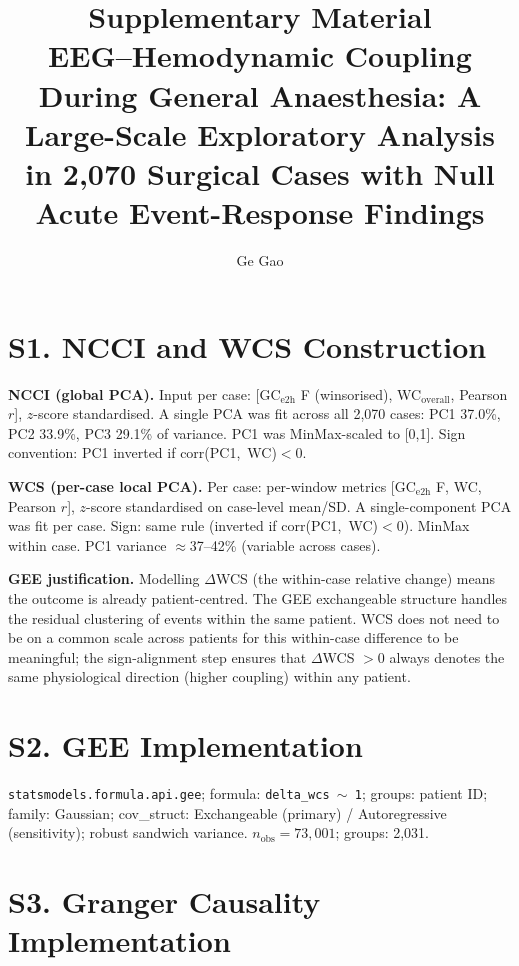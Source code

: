 \documentclass[fleqn,10pt]{wlpeerj}
\title{Supplementary Material\\[4pt]
\large EEG--Hemodynamic Coupling During General Anaesthesia:
A Large-Scale Exploratory Analysis in 2,070 Surgical Cases
with Null Acute Event-Response Findings}
\author[1]{Ge Gao}
\affil[1]{Department of Anesthesiology, The First Affiliated Hospital,
Zhejiang University School of Medicine, Hangzhou, China}
\begin{document}
\flushbottom
\maketitle
\thispagestyle{empty}

\section{S1. NCCI and WCS Construction}

\textbf{NCCI (global PCA).} Input per case: [GC$_\text{e2h}$ F (winsorised),
WC$_\text{overall}$, Pearson $r$], $z$-score standardised. A single PCA was fit across all
2,070 cases: PC1 37.0\%, PC2 33.9\%, PC3 29.1\% of variance. PC1 was MinMax-scaled to [0,1].
Sign convention: PC1 inverted if corr(PC1,~WC)$<$0.

\textbf{WCS (per-case local PCA).} Per case: per-window metrics [GC$_\text{e2h}$ F, WC,
Pearson $r$], $z$-score standardised on case-level mean/SD. A single-component PCA was fit
per case. Sign: same rule (inverted if corr(PC1,~WC)$<$0). MinMax within case. PC1 variance
$\approx$37--42\% (variable across cases).

\textbf{GEE justification.} Modelling $\Delta$WCS (the within-case relative change) means the
outcome is already patient-centred. The GEE exchangeable structure handles the residual
clustering of events within the same patient. WCS does not need to be on a common scale across
patients for this within-case difference to be meaningful; the sign-alignment step ensures
that $\Delta$WCS $>$0 always denotes the same physiological direction (higher coupling) within
any patient.

\section{S2. GEE Implementation}

\texttt{statsmodels.formula.api.gee}; formula: \texttt{delta\_wcs $\sim$ 1}; groups: patient
ID; family: Gaussian; cov\_struct: Exchangeable (primary) / Autoregressive (sensitivity);
robust sandwich variance. $n_\text{obs} = 73{,}001$; groups: 2,031.

\section{S3. Granger Causality Implementation}
\end{document}
